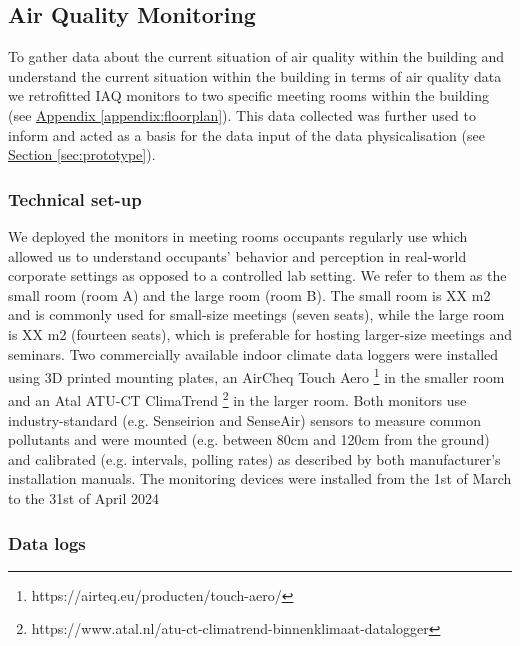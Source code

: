 \subsection{Air Quality Monitoring}
\label{sec:monitoring}

To gather data about the current situation of air quality within the building and understand the current situation within the building in terms of air quality data we retrofitted IAQ monitors to two specific meeting rooms within the building (see \hyperref[appendix:floorplan]{Appendix \ref*{appendix:floorplan}}). This data collected was further used to inform and acted as a basis for the data input of the data physicalisation (see \hyperref[sec:prototype]{Section \ref*{sec:prototype}}).



\subsubsection{Technical set-up}

We deployed the monitors in meeting rooms occupants regularly use which allowed us to understand occupants' behavior and perception in real-world corporate settings as opposed to a controlled lab setting. We refer to them as the small room (room A) and the large room (room B). The small room is XX m2 and is commonly used for small-size meetings (seven seats), while the large room is XX m2 (fourteen seats), which is preferable for hosting larger-size meetings and seminars. Two commercially available indoor climate data loggers were installed using 3D printed mounting plates, an AirCheq Touch Aero \footnote{https://airteq.eu/producten/touch-aero/} in the smaller room and an Atal ATU-CT ClimaTrend \footnote{https://www.atal.nl/atu-ct-climatrend-binnenklimaat-datalogger} in the larger room. Both monitors use industry-standard (e.g. Senseirion and SenseAir) sensors to measure common pollutants and were mounted (e.g. between 80cm and 120cm from the ground) and calibrated (e.g. intervals, polling rates) as described by both manufacturer's installation manuals. The monitoring devices were installed from the 1st of March to the 31st of April 2024

\subsubsection{Data logs}

